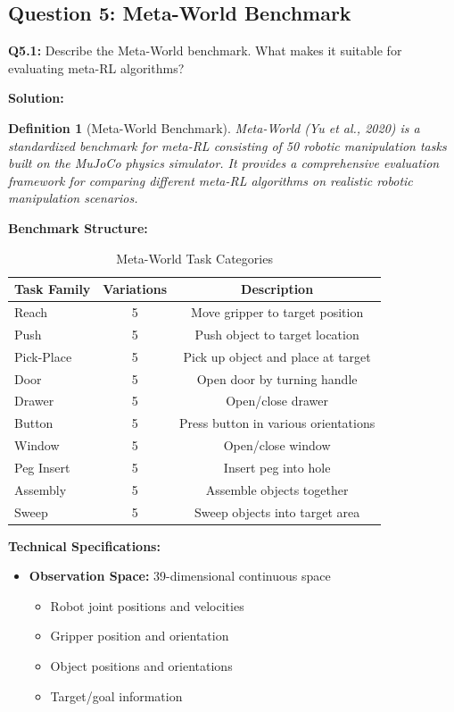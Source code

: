 \documentclass[12pt]{article}
\newcommand{\ieee}[1]{\textcolor{IEEEBlue}{\textbf{#1}}}
\newtheorem{definition}{Definition}
\begin{document}
{{			\subsection{Question 5: Meta-World Benchmark}
			
			\textbf{Q5.1:} Describe the Meta-World benchmark. What makes it suitable for evaluating meta-RL algorithms?
			
			\textbf{Solution:}
			
			\begin{definition}[Meta-World Benchmark]
			Meta-World (Yu et al., 2020) is a standardized benchmark for meta-RL consisting of 50 robotic manipulation tasks built on the MuJoCo physics simulator. It provides a comprehensive evaluation framework for comparing different meta-RL algorithms on realistic robotic manipulation scenarios.
			\end{definition}
			
			\ieee{Benchmark Structure:}
			
			\begin{table}[H]
			\centering
			\caption{Meta-World Task Categories}
			\begin{tabular}{@{}lcc@{}}
			\toprule
			\textbf{Task Family} & \textbf{Variations} & \textbf{Description} \\
			\midrule
			Reach & 5 & Move gripper to target position \\
			Push & 5 & Push object to target location \\
			Pick-Place & 5 & Pick up object and place at target \\
			Door & 5 & Open door by turning handle \\
			Drawer & 5 & Open/close drawer \\
			Button & 5 & Press button in various orientations \\
			Window & 5 & Open/close window \\
			Peg Insert & 5 & Insert peg into hole \\
			Assembly & 5 & Assemble objects together \\
			Sweep & 5 & Sweep objects into target area \\
			\bottomrule
			\end{tabular}
			\label{tab:metaworld_tasks}
			\end{table}
			
			\ieee{Technical Specifications:}
			
			\begin{itemize}
				\item \textbf{Observation Space:} 39-dimensional continuous space
				\begin{itemize}
					\item Robot joint positions and velocities
					\item Gripper position and orientation
					\item Object positions and orientations
					\item Target/goal information
				\end{itemize}
				

\end{itemize}}}
\end{document}
